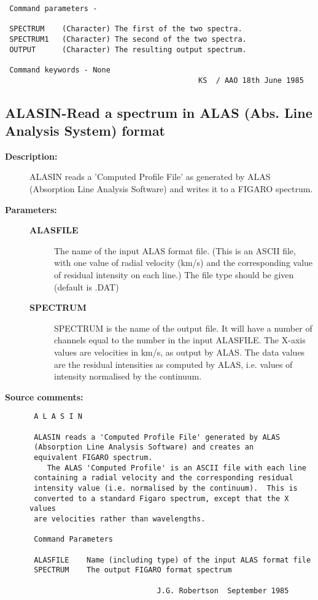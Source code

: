 \begin{description}
\begin{verbatim}
 Command parameters -

 SPECTRUM    (Character) The first of the two spectra.
 SPECTRUM1   (Character) The second of the two spectra.
 OUTPUT      (Character) The resulting output spectrum.

 Command keywords - None
                                            KS  / AAO 18th June 1985
\end{verbatim}
\end{description}
\subsection{ALASIN-\label{ALASIN}Read a spectrum in ALAS (Abs. Line Analysis System) format}
\begin{description}

\item [{\bf Description:}]
 ALASIN reads a 'Computed Profile File' as generated by ALAS
 (Absorption Line Analysis Software) and writes it to a FIGARO
 spectrum.

\item [{\bf Parameters:}]
\begin{description}
\item [{\bf ALASFILE}]
 The name of the input ALAS format file. (This is an
 ASCII file, with one value of radial velocity (km/s) and the
 corresponding value of residual intensity on each line.)
 The file type should be given (default is .DAT)
\item [{\bf SPECTRUM}]
 SPECTRUM is the name of the output file.  It will have a
 number of channels equal to the number in the input ALASFILE.
 The X-axis values are velocities in km/s, as output by ALAS.
 The data values are the residual intensities as computed by ALAS,
 i.e. values of intensity normalised by the continuum.
\end{description}

\item [{\bf Source comments:}]
\begin{verbatim}
 A L A S I N

 ALASIN reads a 'Computed Profile File' generated by ALAS
 (Absorption Line Analysis Software) and creates an
 equivalent FIGARO spectrum.
    The ALAS 'Computed Profile' is an ASCII file with each line
 containing a radial velocity and the corresponding residual
 intensity value (i.e. normalised by the continuum).  This is
 converted to a standard Figaro spectrum, except that the X values
 are velocities rather than wavelengths.

 Command Parameters

 ALASFILE    Name (including type) of the input ALAS format file
 SPECTRUM    The output FIGARO format spectrum

                             J.G. Robertson  September 1985
\end{verbatim}
\end{description}
